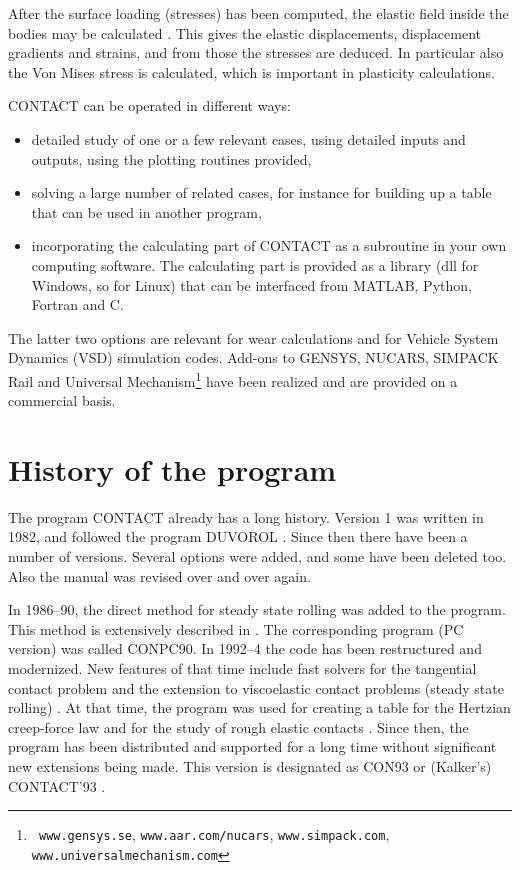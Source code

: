 \documentclass[12pt]{report}
\begin{document}
After the surface loading (stresses) has been computed, the elastic field
inside the bodies may be calculated \cite{Kalker1986a,Wekken2019a-subsurf}.
This gives the elastic displacements, displacement gradients and strains,
and from those the stresses are deduced. In particular also the Von Mises
stress is calculated, which is important in plasticity calculations.

CONTACT can be operated in different ways:
\begin{itemize}
\item detailed study of one or a few relevant cases, using detailed inputs
        and outputs, using the plotting routines provided,
\item solving a large number of related cases, for instance for building up
        a table that can be used in another program,
\item incorporating the calculating part of CONTACT as a subroutine in your
        own computing software. The calculating part is provided as a
        library (dll for Windows, so for Linux) that can be interfaced from
        MATLAB, Python, Fortran and C.
\end{itemize}
The latter two options are relevant for wear calculations and for Vehicle
System Dynamics (VSD) simulation codes. Add-ons to GENSYS, NUCARS, SIMPACK
Rail \cite{Vollebregt2011b-iavsd2011} and Universal Mechanism\footnote{{\tt
www.gensys.se}, {\tt www.aar.com/nucars}, {\tt www.simpack.com}, {\tt 
www.universalmechanism.com}} have been realized and are provided on a
commercial basis.

\section{History of the program}

The program CONTACT already has a long history. Version 1 was written in
1982, and followed the program DUVOROL \cite{Kalker1979a,Tsjoeng1980}. Since
then there have been a number of versions. Several options were added, and
some have been deleted too. Also the manual was revised over and over again.

In 1986--90, the direct method for steady state rolling was added to the
program. This method is extensively described in \cite{Kalker1990}. The
corresponding program (PC version) was called CONPC90. In 1992--4 the code
has been restructured and modernized.  New features of that time include
fast solvers for the tangential contact problem
\cite{Vollebregt1995a-convexgs} and the extension to viscoelastic contact
problems (steady state rolling)
\cite{Wang_guangqiu1992b,Wang_guangqiu1993}. At that time, the program was
used for creating a table for the Hertzian creep-force law
\cite{Kalker1996b-usetab} and for the study of rough elastic contacts
\cite{Kalker1997}. Since then, the program has been distributed and
supported for a long time without significant new extensions being made.
This version is designated as CON93 or (Kalker's) CONTACT'93
\cite{Vollebregt1993f-con93}.
\end{document}
